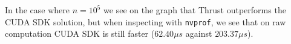 \documentclass[preprint]{sigplanconf}
\begin{document}
In the case where $n=10^5$ we see on the graph that Thrust outperforms
the CUDA SDK solution, but when inspecting with \verb|nvprof|, we
see that on raw computation CUDA SDK is still faster ($62.40 \mu s$
against $203.37\mu s$).






\end{document}
